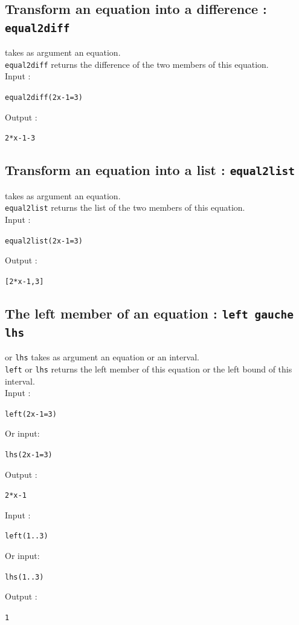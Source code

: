 \documentclass[a4paper,11pt]{book}
\begin{document}
\subsection{Transform an equation into a difference : {\tt equal2diff}}
 takes as argument an equation.\\
{\tt equal2diff} returns the difference of the two members of this equation.\\
Input :
\begin{center}{\tt equal2diff(2x-1=3)}\end{center}
Output :
\begin{center}{\tt 2*x-1-3}\end{center}

\subsection{Transform an equation into a list : {\tt equal2list}}
 takes as argument an equation.\\
{\tt equal2list} returns the list of the two members of this equation.\\
Input :
\begin{center}{\tt equal2list(2x-1=3)}\end{center}
Output :
\begin{center}{\tt [2*x-1,3]}\end{center}

\subsection{The left member of an equation : {\tt left  gauche lhs}}
 or {\tt lhs} takes as argument an equation or an 
interval.\\
{\tt left}  or {\tt lhs} returns the left member of this equation or the left
bound  of this interval.\\
Input :
\begin{center}{\tt left(2x-1=3)}\end{center}
Or input:
\begin{center}{\tt lhs(2x-1=3)}\end{center}
Output :
\begin{center}{\tt 2*x-1}\end{center}
Input :
\begin{center}{\tt left(1..3)}\end{center}
Or input:
\begin{center}{\tt lhs(1..3)}\end{center}
Output :
\begin{center}{\tt 1}\end{center}
\end{document}
